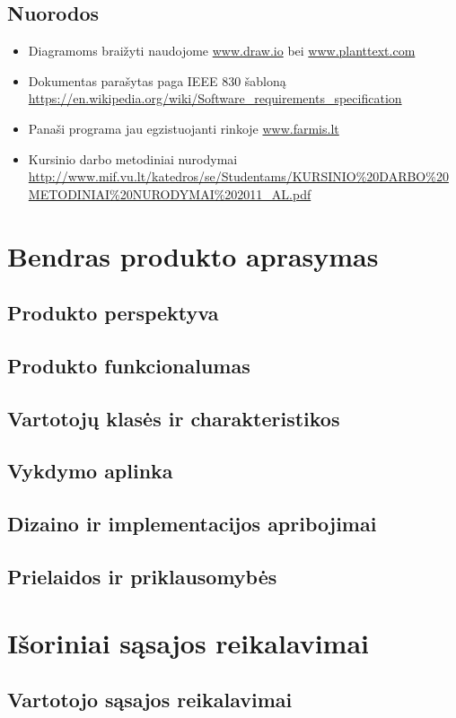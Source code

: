 \documentclass[oneside]{VUMIFPSkursinis}
\begin{document}
\subsection{Nuorodos}
\begin{itemize}
	\item Diagramoms braižyti naudojome \url{www.draw.io} bei \url{www.planttext.com}
	\item Dokumentas parašytas paga IEEE 830 šabloną \url{https://en.wikipedia.org/wiki/Software_requirements_specification}
	\item Panaši programa jau egzistuojanti rinkoje \url{www.farmis.lt}
	\item Kursinio darbo metodiniai nurodymai \url{http://www.mif.vu.lt/katedros/se/Studentams/KURSINIO%20DARBO%20METODINIAI%20NURODYMAI%202011_AL.pdf}
\end{itemize}

\section{Bendras produkto aprasymas}
\subsection{Produkto perspektyva}
\subsection{Produkto funkcionalumas}
\subsection{Vartotojų klasės ir charakteristikos}
\subsection{Vykdymo aplinka}
\subsection{Dizaino ir implementacijos apribojimai}
\subsection{Prielaidos ir priklausomybės}

\section{Išoriniai sąsajos reikalavimai}
\subsection{Vartotojo sąsajos reikalavimai}
\end{document}

